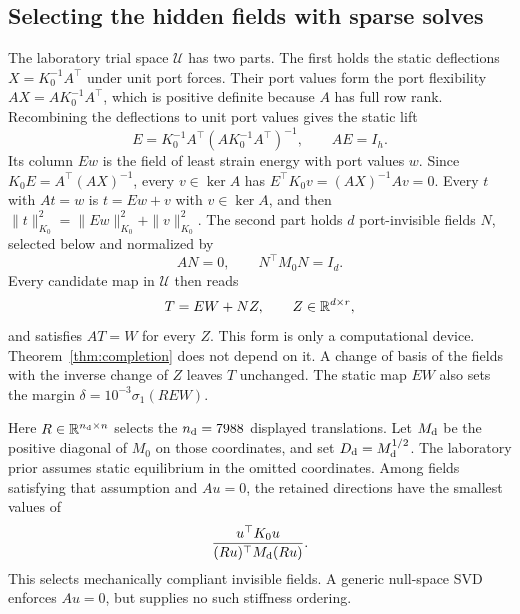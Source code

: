 \subsection{Selecting the hidden fields with sparse solves}\label{sec:field-selection}
The laboratory trial space $\mathcal U$ has two parts. The first holds the
static deflections $X=K_0^{-1}A^{\top}$ under unit port forces. Their port
values form the port flexibility $AX=AK_0^{-1}A^{\top}$, which is positive
definite because $A$ has full row rank. Recombining the deflections to unit
port values gives the static lift
\begin{equation}
 E=K_0^{-1}A^{\top}(AK_0^{-1}A^{\top})^{-1},\qquad AE=I_h.
 \label{eq:lift}
\end{equation}
Its column $Ew$ is the field of least strain energy with port values $w$.
Since $K_0E=A^{\top}(AX)^{-1}$, every $v\in\ker A$ has
$E^{\top}K_0v=(AX)^{-1}Av=0$. Every $t$ with $At=w$ is $t=Ew+v$ with
$v\in\ker A$, and then $\|t\|_{K_0}^2=\|Ew\|_{K_0}^2+\|v\|_{K_0}^2$.
The second part holds $d$ port-invisible fields $N$, selected below and
normalized by
\begin{equation}
 AN=0,\qquad N^{\top}M_0N=I_d.
 \label{eq:hidden}
\end{equation}
Every candidate map in $\mathcal U$ then reads
\begin{equation}
 T=EW+NZ,\qquad Z\in\mathbb R^{d\times r},
 \label{eq:completion}
\end{equation}
and satisfies $AT=W$ for every $Z$. This form is only a computational
device. Theorem~\ref{thm:completion} does not depend on it. A change of
basis of the fields with the inverse change of $Z$ leaves $T$ unchanged.
The static map
$EW$ also sets the margin $\delta=10^{-3}\sigma_1(REW)$.

Here $R\in\mathbb R^{n_{\rm d}\times n}$ selects the $n_{\rm d}=7988$ displayed
translations. Let $M_{\rm d}$ be the positive diagonal of $M_0$ on those coordinates, and set
$D_{\rm d}=M_{\rm d}^{1/2}$. The laboratory prior assumes static equilibrium in
the omitted coordinates. Among fields satisfying that assumption and
$Au=0$, the retained directions have the smallest values of
\[
 \frac{u^{\top}K_0u}{(Ru)^{\top}M_{\rm d}(Ru)}.
\]
This selects mechanically compliant invisible fields. A generic null-space
SVD enforces $Au=0$, but supplies no such stiffness ordering.


